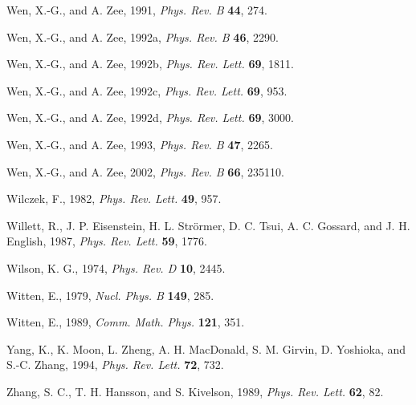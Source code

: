 \begin{list}{}{\setlength{\leftmargin}{2em}\setlength{\itemindent}{-2em}}
\item Wen, X.-G., and A. Zee, 1991, \emph{Phys. Rev. B} \textbf{44}, 274.
\item Wen, X.-G., and A. Zee, 1992a, \emph{Phys. Rev. B} \textbf{46}, 2290.
\item Wen, X.-G., and A. Zee, 1992b, \emph{Phys. Rev. Lett.} \textbf{69}, 1811.
\item Wen, X.-G., and A. Zee, 1992c, \emph{Phys. Rev. Lett.} \textbf{69}, 953.
\item Wen, X.-G., and A. Zee, 1992d, \emph{Phys. Rev. Lett.} \textbf{69}, 3000.
\item Wen, X.-G., and A. Zee, 1993, \emph{Phys. Rev. B} \textbf{47}, 2265.
\item Wen, X.-G., and A. Zee, 2002, \emph{Phys. Rev. B} \textbf{66}, 235110.
\item Wilczek, F., 1982, \emph{Phys. Rev. Lett.} \textbf{49}, 957.
\item Willett, R., J. P. Eisenstein, H. L. Str\"{o}rmer, D. C. Tsui, A. C. Gossard, and J. H. English, 1987, \emph{Phys. Rev. Lett.} \textbf{59}, 1776.
\item Wilson, K. G., 1974, \emph{Phys. Rev. D} \textbf{10}, 2445.
\item Witten, E., 1979, \emph{Nucl. Phys. B} \textbf{149}, 285.
\item Witten, E., 1989, \emph{Comm. Math. Phys.} \textbf{121}, 351.
\item Yang, K., K. Moon, L. Zheng, A. H. MacDonald, S. M. Girvin, D. Yoshioka, and S.-C. Zhang, 1994, \emph{Phys. Rev. Lett.} \textbf{72}, 732.
\item Zhang, S. C., T. H. Hansson, and S. Kivelson, 1989, \emph{Phys. Rev. Lett.} \textbf{62}, 82.

\end{list}
